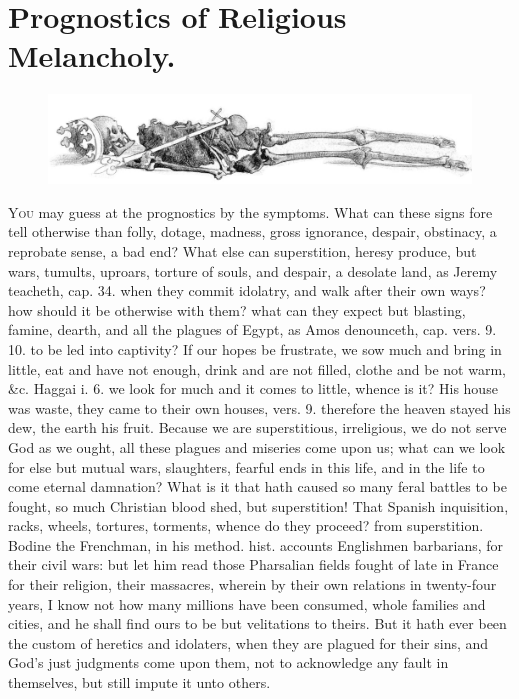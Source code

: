 {\section{Prognostics of Religious Melancholy.}
\begin{figure}[H]
  \begingroup
  \centering
  \includegraphics[keepaspectratio,width=\textwidth]{figures/skeltal-small.jpg}
  \label{fig:skeltal}
\end{figure}
\lettrine{Y}{ou} may guess at the prognostics by the symptoms. What can these signs
fore tell otherwise than folly, dotage, madness, gross ignorance,
despair, obstinacy, a reprobate sense, a bad end? What else can
superstition, heresy produce, but wars, tumults, uproars, torture of
souls, and despair, a desolate land, as Jeremy teacheth, cap.  34.
when they commit idolatry, and walk after their own ways? how should it
be otherwise with them? what can they expect but blasting, famine,
dearth, and all the plagues of Egypt, as Amos denounceth, cap. 
vers. 9. 10. to be led into captivity? If our hopes be frustrate, we
sow much and bring in little, eat and have not enough, drink and are
not filled, clothe and be not warm, \&c. Haggai i. 6. we look for much
and it comes to little, whence is it? His house was waste, they came to
their own houses, vers. 9. therefore the heaven stayed his dew, the
earth his fruit. Because we are superstitious, irreligious, we do not
serve God as we ought, all these plagues and miseries come upon us;
what can we look for else but mutual wars, slaughters, fearful ends in
this life, and in the life to come eternal damnation? What is it that
hath caused so many feral battles to be fought, so much Christian blood
shed, but superstition! That Spanish inquisition, racks, wheels,
tortures, torments, whence do they proceed? from superstition. Bodine
the Frenchman, in his method. hist. accounts Englishmen
barbarians, for their civil wars: but let him read those Pharsalian
fields fought of late in France for their religion, their
massacres, wherein by their own relations in twenty-four years, I know
not how many millions have been consumed, whole families and cities,
and he shall find ours to be but velitations to theirs. But it hath
ever been the custom of heretics and idolaters, when they are plagued
for their sins, and God's just judgments come upon them, not to
acknowledge any fault in themselves, but still impute it unto others.

}
